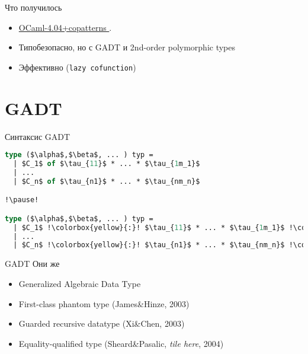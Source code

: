 \documentclass[10pt, mathserif]{beamer}
\theoremstyle{definition}
\begin{document}
\begin{frame}[fragile]{Что получилось}
\begin{itemize}
 \item \href{https://github.com/yurug/ocaml4.04.0-copatterns}{OCaml-4.04+copatterns \faGithub}.
 \item Типобезопасно, но с GADT и 2nd-order polymorphic types
 \item Эффективно (\lstinline=lazy cofunction=)
\end{itemize}
\end{frame}



\section{GADT}

\begin{frame}[fragile]{Синтаксис GADT}
\begin{lstlisting}[language=ocaml,mathescape=true]
type ($\alpha$,$\beta$, ... ) typ =
  | $C_1$ of $\tau_{11}$ * ... * $\tau_{1m_1}$
  | ...
  | $C_n$ of $\tau_{n1}$ * ... * $\tau_{nm_n}$

!\pause!

type ($\alpha$,$\beta$, ... ) typ =
  | $C_1$ !\colorbox{yellow}{:}! $\tau_{11}$ * ... * $\tau_{1m_1}$ !\colorbox{yellow}{$\rightarrow$ ($t_{11}$, $t_{12}$, ...) typ}!
  | ...
  | $C_n$ !\colorbox{yellow}{:}! $\tau_{n1}$ * ... * $\tau_{nm_n}$ !\colorbox{yellow}{$\rightarrow$ ($t_{n1}$, $t_{n2}$, ...) typ}!
\end{lstlisting}
\end{frame}

\begin{frame}[fragile]{GADT}
Они же
\begin{itemize}
\item Generalized Algebraic Data Type
\item First-class phantom type (James\&Hinze, 2003)
\item Guarded recursive datatype (Xi\&Chen, 2003)
\item Equality-qualified type (Sheard\&Pasalic, \textit{tile here}, 2004)
\end{itemize}
\end{frame}
\end{document}
